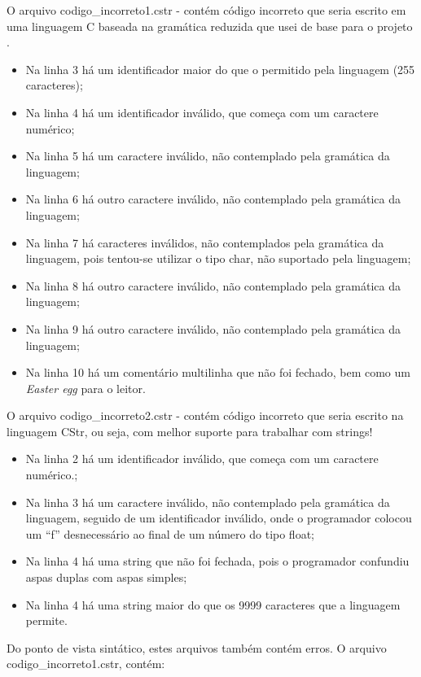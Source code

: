 \documentclass[12pt]{article}
\begin{document}
O arquivo codigo\_incorreto1.cstr - contém código incorreto que seria escrito em uma linguagem C baseada na gramática reduzida que usei de base para o projeto \cite{minic}.
\begin{itemize}
	\item Na linha 3 há um identificador maior do que o permitido pela linguagem (255 caracteres);
	\item Na linha 4 há um identificador inválido, que começa com um caractere numérico;
	\item Na linha 5 há um caractere inválido, não contemplado pela gramática da linguagem;
	\item Na linha 6 há outro caractere inválido, não contemplado pela gramática da linguagem;
	\item Na linha 7 há caracteres inválidos, não contemplados pela gramática da linguagem, pois tentou-se utilizar o tipo char, não suportado pela linguagem;
	\item Na linha 8 há outro caractere inválido, não contemplado pela gramática da linguagem;
	\item Na linha 9 há outro caractere inválido, não contemplado pela gramática da linguagem;
	\item Na linha 10 há um comentário multilinha que não foi fechado, bem como um \textit{Easter egg} para o leitor.
\end{itemize}

O arquivo codigo\_incorreto2.cstr - contém código incorreto que seria escrito na linguagem CStr, ou seja, com melhor suporte para trabalhar com strings!\\
\begin{itemize}
	\item Na linha 2 há um identificador inválido, que começa com um caractere numérico.;
	\item Na linha 3 há um caractere inválido, não contemplado pela gramática da linguagem, seguido de um identificador inválido, onde o programador colocou um ``f'' desnecessário ao final de um número do tipo float;
	\item Na linha 4 há uma string que não foi fechada, pois o programador confundiu aspas duplas com aspas simples;
	\item Na linha 4 há uma string maior do que os 9999 caracteres que a linguagem permite.\\
\end{itemize}

Do ponto de vista sintático, estes arquivos também contém erros. O arquivo codigo\_incorreto1.cstr, contém:
\end{document}
